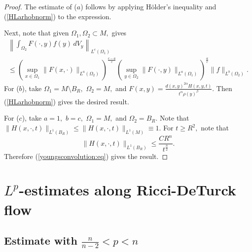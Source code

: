 \documentclass[12pt]{amsart}
\renewcommand{\1}{{\mathbf 1}}
\theoremstyle{others}
\numberwithin{equation}{section}
\begin{document}
\begin{proof}
The estimate of ($a$) follows by applying H\"older's inequality and (\ref{HLarhobnorm}) to the expression.

Next, note that given $\Omega_1, \Omega_2 \subset M,$ \cite[Proposition 3.64]{AubinBook} gives
       \begin{multline}\label{youngsconvolution:eq}
           \left\| \int_{\Omega_2} F(\cdot,y) f(y) \, dV_y \right\|_{L^c(\Omega_1)} \\ 
           \leq \left( \sup_{x \in \Omega_1} \|F(x, \cdot) \|_{L^a(\Omega_2)} \right)^{\frac{c - a}{c}} \left( \sup_{y \in \Omega_2} \|F(\cdot, y) \|_{L^a(\Omega_1)} \right)^{\frac{a}{c}} \| f \|_{L^b(\Omega_2)}.
       \end{multline}
        For ($b$), take $\Omega_1 = M \setminus B_R,$ $\Omega_2 = M,$ and $F(x,y) = \frac{d(x, y)^{2 \alpha} H(x,y,t) }{t^\alpha \rho(y)^\beta}.$ Then (\ref{HLarhobnorm}) gives the desired result.

        For ($c$), take $a = 1,$ $b = c,$ $\Omega_1 = M,$ and $\Omega_2 = B_R.$ Note that $\|H(x, \cdot, t)\|_{L^1(B_R)} \leq \|H(x, \cdot, t)\|_{L^1(M)} \equiv 1.$ For $t \geq R^2,$ note that
        $$\|H(x, \cdot, t)\|_{L^1(B_R)} \leq \frac{C R^n}{t^{\frac{n}{2} } }.$$
        Therefore (\ref{youngsconvolution:eq}) gives the result.        
\end{proof}




\vspace{10mm}




\section{$L^p$-estimates along Ricci-DeTurck flow}

\subsection{Estimate with $\frac{n}{n-2} < p < n$}\label{ss:proofofLpprop}
\end{document}
